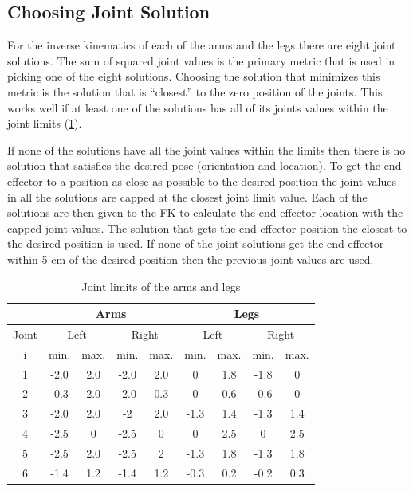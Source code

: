 \documentclass[letterpaper, 10 pt, conference]{IEEEtran}
\begin{document}
\subsection{Choosing Joint Solution}
For the inverse kinematics of each of the arms and the legs there are eight joint solutions. The sum of squared joint values is the primary metric that is used in picking one of the eight solutions. Choosing the solution that minimizes this metric is the solution that is ``closest'' to the zero position of the joints. This works well if at least one of the solutions has all of its joints values within the joint limits (\cref{tbl:jointLimits}).

If none of the solutions have all the joint values within the limits then there is no solution that satisfies the desired pose (orientation and location). To get the end-effector to a position as close as possible to the desired position the joint values in all the solutions are capped at the closest joint limit value. Each of the solutions are then given to the FK to calculate the end-effector location with the capped joint values. The solution that gets the end-effector position the closest to the desired position is used. If none of the joint solutions get the end-effector within 5 cm of the desired position then the previous joint values are used.

\begin{table}[h]
    \centering
    \caption{Joint limits of the arms and legs}
    \begin{tabular}{|c|c|c|c|c||c|c|c|c|} \hline
    \ & \multicolumn{4}{|c||}{Arms} & \multicolumn{4}{|c|}{Legs} \\ \hline
    Joint & \multicolumn{2}{|c|}{Left} & \multicolumn{2}{|c||}{Right} & \multicolumn{2}{|c|}{Left} & \multicolumn{2}{|c|}{Right} \\ \hline
    i & min.  & max.  & min.  & max.  & min.  & max.  & min.  & max.  \\ \hline
    1 & -2.0 & 2.0 & -2.0 & 2.0 & 0 & 1.8 & -1.8 & 0 \\ \hline
    2 & -0.3 & 2.0 & -2.0 & 0.3 & 0 & 0.6 & -0.6 & 0 \\ \hline
    3 & -2.0 & 2.0 & -2 & 2.0 & -1.3 & 1.4 & -1.3 & 1.4 \\ \hline
    4 & -2.5 & 0 & -2.5 & 0 & 0 & 2.5 & 0 & 2.5 \\ \hline
    5 & -2.5 & 2.0 & -2.5 & 2 & -1.3 & 1.8 & -1.3 & 1.8 \\ \hline
    6 & -1.4 & 1.2 & -1.4 & 1.2 & -0.3 & 0.2 & -0.2 & 0.3 \\ \hline
    \end{tabular} \label{tbl:jointLimits}
\end{table}
\end{document}
